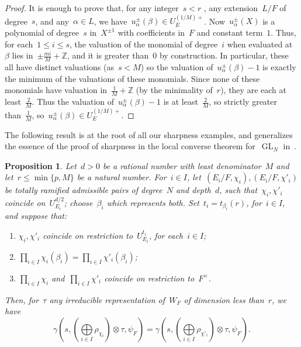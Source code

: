 \documentclass[12pt]{amsart}
\newcommand{\BZ}{\mathbb {Z}}
\newcommand{\GL}{\operatorname{GL}}
\newtheorem{prop}[thm]{Proposition}
\newtheorem{prop}[equation]{Proposition}
\begin{document}
\begin{proof}
It is enough to prove that, for any integer~$s < r$%
, any extension~$L/F$ of degree~$s$, and any~$\alpha\in L$, we have~$u^{\pm}_\alpha(\beta)\in U_E^{(1/M)+}$. Now~$u^{\pm}_\alpha(X)$ is a polynomial of degree~$s$ in~$X^{\pm 1}$ with coefficients in~$F$ and constant term~$1$. Thus, for each~$1\le i\le s$, the valuation of the monomial of degree~$i$ when evaluated at~$\beta$ lies in~$\pm \frac{mi}M +\BZ$, and it is greater than~$0$ by construction. In particular, these all have distinct valuations (as~$s<M$) so the valuation of~$u^{\pm}_\alpha(\beta)-1$ is exactly the minimum of the valuations of these monomials. Since none of these monomials have valuation in~$\frac 1M+\BZ$ (by the minimality of~$r$), they are each at least~$\frac 2M$. Thus the valuation of~$u^{\pm}_\alpha(\beta)-1$ is at least~$\frac 2M$, so strictly greater than~$\frac 1M$, so~$u^{\pm}_\alpha(\beta)\in U_E^{(1/M)+}$.
\end{proof}

The following result is at the root of all our sharpness examples, and generalizes the essence of the proof of sharpness in the local converse theorem for~$\GL_N$ in~\cite{ALST18,A22}.

\begin{prop}\label{prop:basic2}
Let~$d>0$ be a rational number with least denominator~$M$ and let~$r\le \min\{p,M\}$ be a natural number. 
For~$i\in I$, let~$(E_i/F,\chi_i),(E_i/F,\chi'_i)$ be totally ramified admissible pairs of degree~$N$ and depth~$d$, such that~$\chi_i,\chi'_i$ coincide on~$U^{d/2}_{E_i}$; choose~$\beta_i$ which represents both. Set~$t_i=t_{\beta_i}(r)$, for~$i\in I$, and suppose that:
\begin{enumerate}
\item\label{prop:basic2.i} $\chi_i,\chi'_i$ coincide on restriction to~$U_{E_i}^{t_i}$, for each~$i\in I$;\\[-8pt]
\item\label{prop:basic2.ii} $\prod_{i\in I} \chi_i(\beta_i) = \prod_{i\in I} \chi'_i(\beta_i)$;\\[-8pt]
\item\label{prop:basic2.iii} $ \prod_{i\in I} \chi_i$ and~$\prod_{i\in I} \chi'_i$ coincide on restriction to~$F^\times$.
\end{enumerate}
Then, for~$\tau$ any irreducible representation of~$W_F$ of dimension less than~$r$, we have
\[\textstyle
\gamma(s,(\bigoplus\limits_{i\in I} \rho_{\chi_i})\otimes\tau,\psi_F) = \gamma(s,(\bigoplus\limits_{i\in I} \rho_{\chi'_i})\otimes\tau,\psi_F).
\]
\end{prop}
\end{document}

